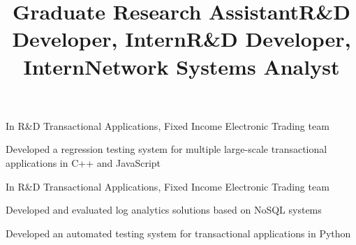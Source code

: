 \documentclass[margin,line]{resume}
\begin{document}
\begin{resume}
    \title{\textbf{Graduate Research Assistant}}
    \begin{position}\end{position}

    \title{\textbf{R\&D Developer, Intern}}
    \begin{position}
    \end{position}
    
    In R\&D Transactional Applications, Fixed Income Electronic Trading team
    \begin{list3}
    \item Developed a regression testing system for multiple large-scale transactional applications in C++ and JavaScript
    \end{list3}

    \title{\textbf{R\&D Developer, Intern}}
    \begin{position}

    In R\&D Transactional Applications, Fixed Income Electronic Trading team
    \begin{list3}
    \item Developed and evaluated log analytics solutions based on NoSQL systems
    \item Developed an automated testing system for transactional applications in Python
    \end{list3}
    \end{position}
    
    \title{\textbf{Network Systems Analyst}}
    \begin{position}
    \vspace{-2mm}
    \end{position}


\end{resume}
\end{document}
